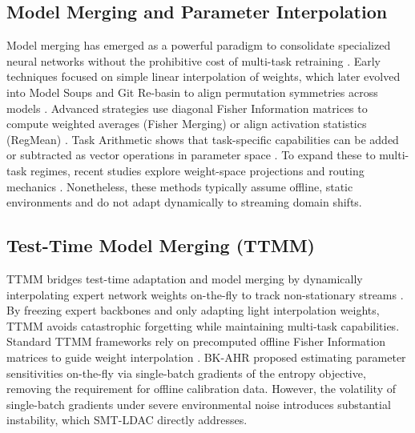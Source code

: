\documentclass{article}
\theoremstyle{plain}
\theoremstyle{definition}
\theoremstyle{remark}
\begin{document}
\subsection{Model Merging and Parameter Interpolation}
Model merging has emerged as a powerful paradigm to consolidate specialized neural networks without the prohibitive cost of multi-task retraining \cite{Wortsman2022ModelSA, Yang2023AdaMergingAM}. Early techniques focused on simple linear interpolation of weights, which later evolved into Model Soups \cite{Croce2023SeasoningMS} and Git Re-basin to align permutation symmetries across models \cite{Aminbeidokhti2025LTSoupsBH, Motyka2025IsHM}. Advanced strategies use diagonal Fisher Information matrices to compute weighted averages (Fisher Merging) \cite{Kim2024MethodologyFL} or align activation statistics (RegMean) \cite{Zimmer2023SparseMS}. Task Arithmetic shows that task-specific capabilities can be added or subtracted as vector operations in parameter space \cite{Gargiulo2024TaskSV}. To expand these to multi-task regimes, recent studies explore weight-space projections and routing mechanics \cite{Wasfy2023EnhancingLS, Dansereau2023ModelST, Maron2022ModelSI, Tang2025MergingMO, Yang2025MixDO, Xie2025BoneSA}. Nonetheless, these methods typically assume offline, static environments and do not adapt dynamically to streaming domain shifts.

\subsection{Test-Time Model Merging (TTMM)}
TTMM bridges test-time adaptation and model merging by dynamically interpolating expert network weights on-the-fly to track non-stationary streams \cite{yang2024testtime, Suzuki2022ModelSF}. By freezing expert backbones and only adapting light interpolation weights, TTMM avoids catastrophic forgetting while maintaining multi-task capabilities. Standard TTMM frameworks rely on precomputed offline Fisher Information matrices to guide weight interpolation \cite{Jang2023PersonalizedSP}. BK-AHR proposed estimating parameter sensitivities on-the-fly via single-batch gradients of the entropy objective, removing the requirement for offline calibration data. However, the volatility of single-batch gradients under severe environmental noise introduces substantial instability, which SMT-LDAC directly addresses.
\end{document}
